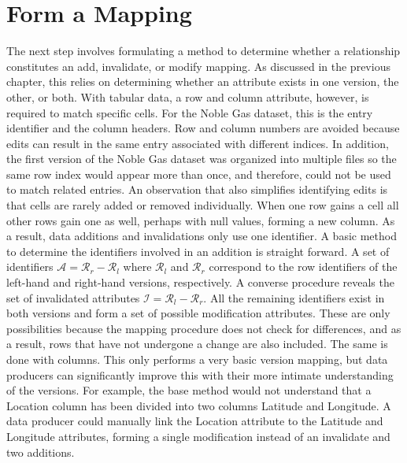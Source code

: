 \section{Form a Mapping} \label{mapping}

The next step involves formulating a method to determine whether a relationship constitutes an add, invalidate, or modify mapping.
As discussed in the previous chapter, this relies on determining whether an attribute exists in one version, the other, or both.
With tabular data, a row and column attribute, however, is required to match specific cells.
For the Noble Gas dataset, this is the entry identifier and the column headers.
Row and column numbers are avoided because edits can result in the same entry associated with different indices.
In addition, the first version of the Noble Gas dataset was organized into multiple files so the same row index would appear more than once, and therefore, could not be used to match related entries.
An observation that also simplifies identifying edits is that cells are rarely added or removed individually.
When one row gains a cell all other rows gain one as well, perhaps with null values, forming a new column.
As a result, data additions and invalidations only use one identifier.
A basic method to determine the identifiers involved in an addition is straight forward.
A set of identifiers \(\mathcal{A} = \mathcal{R}_{r} - \mathcal{R}_{l}\) where \(\mathcal{R}_{l}\) and \(\mathcal{R}_{r}\) correspond to the row identifiers of the left-hand and right-hand versions, respectively.
A converse procedure reveals the set of invalidated attributes \(\mathcal{I} = \mathcal{R}_{l} - \mathcal{R}_{r}\).
All the remaining identifiers exist in both versions and form a set of possible modification attributes.
These are only possibilities because the mapping procedure does not check for differences, and as a result, rows that have not undergone a change are also included.
The same is done with columns.
This only performs a very basic version mapping, but data producers can significantly improve this with their more intimate understanding of the versions.
For example, the base method would not understand that a Location column has been divided into two columns Latitude and Longitude.
A data producer could manually link the Location attribute to the Latitude and Longitude attributes, forming a single modification instead of an invalidate and two additions.

